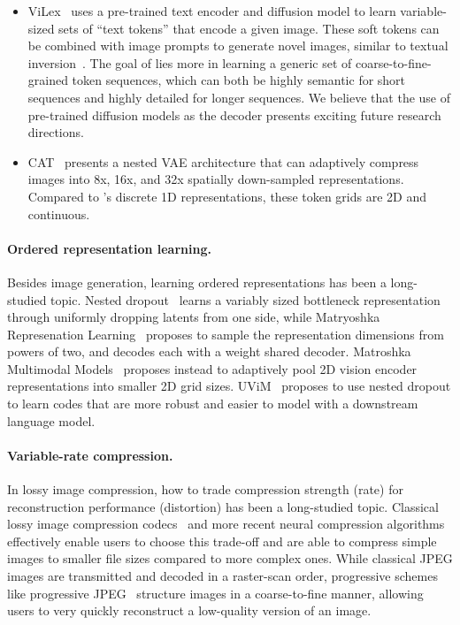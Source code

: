 \begin{itemize}
    \item ViLex~\cite{Wang2024ViLex} uses a pre-trained text encoder and diffusion model to learn variable-sized sets of ``text tokens'' that encode a given image. These soft tokens can be combined with image prompts to generate novel images, similar to textual inversion~\cite{Gal2022TextualInversion}. The goal of \ours lies more in learning a generic set of coarse-to-fine-grained token sequences, which can both be highly semantic for short sequences and highly detailed for longer sequences. We believe that the use of pre-trained diffusion models as the decoder presents exciting future research directions.
    \item CAT~\cite{Shen2025CATCI} presents a nested VAE architecture that can adaptively compress images into 8x, 16x, and 32x spatially down-sampled representations. Compared to \ours's discrete 1D representations, these token grids are 2D and continuous.
\end{itemize}

\paragraph{Ordered representation learning.}
Besides image generation, learning ordered representations has been a long-studied topic. Nested dropout~\cite{Rippel2014NestedDropout} learns a variably sized bottleneck representation through uniformly dropping latents from one side, while Matryoshka Represenation Learning~\cite{Kusupati2022MatryoshkaRepr} proposes to sample the representation dimensions from powers of two, and decodes each with a weight shared decoder. Matroshka Multimodal Models~\cite{Cai2024MatryoshkaMM} proposes instead to adaptively pool 2D vision encoder representations into smaller 2D grid sizes. UViM~\cite{Kolesnikov2022UViM} proposes to use nested dropout to learn codes that are more robust and easier to model with a downstream language model.

\paragraph{Variable-rate compression.}
In lossy image compression, how to trade compression strength (rate) for reconstruction performance (distortion) has been a long-studied topic. Classical lossy image compression codecs~\cite{wallace1992jpeg, Zern2024WebP, jpeg2000} and more recent neural compression algorithms~\cite{Mentzer2020HighFidelityGI, ElNouby2022PQMIM, Hoogeboom2023HighFidelityIC} effectively enable users to choose this trade-off and are able to compress simple images to smaller file sizes compared to more complex ones. While classical JPEG images are transmitted and decoded in a raster-scan order, progressive schemes like progressive JPEG~\cite{wallace1992jpeg} structure images in a coarse-to-fine manner, allowing users to very quickly reconstruct a low-quality version of an image.



